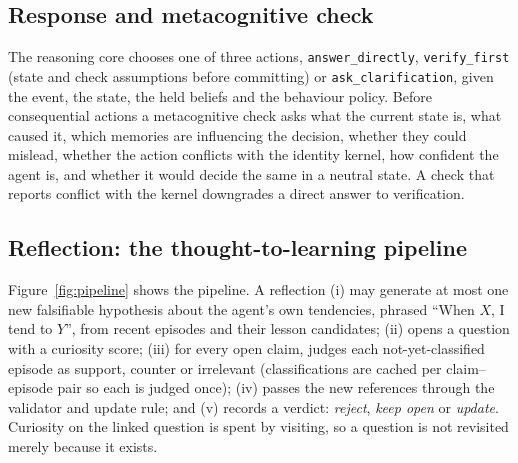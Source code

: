 \documentclass[11pt]{article}
\begin{document}
\subsection{Response and metacognitive check}
The reasoning core chooses one of three actions, \texttt{answer\_directly}, \texttt{verify\_first} (state and check assumptions before committing) or \texttt{ask\_clarification}, given the event, the state, the held beliefs and the behaviour policy. Before consequential actions a metacognitive check asks what the current state is, what caused it, which memories are influencing the decision, whether they could mislead, whether the action conflicts with the identity kernel, how confident the agent is, and whether it would decide the same in a neutral state. A check that reports conflict with the kernel downgrades a direct answer to verification.

\subsection{Reflection: the thought-to-learning pipeline}\label{sec:reflection}
Figure~\ref{fig:pipeline} shows the pipeline. A reflection (i) may generate at most one new falsifiable hypothesis about the agent's own tendencies, phrased ``When $X$, I tend to $Y$'', from recent episodes and their lesson candidates; (ii) opens a question with a curiosity score; (iii) for every open claim, judges each not-yet-classified episode as support, counter or irrelevant (classifications are cached per claim--episode pair so each is judged once); (iv) passes the new references through the validator and update rule; and (v) records a verdict: \emph{reject}, \emph{keep open} or \emph{update}. Curiosity on the linked question is spent by visiting, so a question is not revisited merely because it exists.
\end{document}
